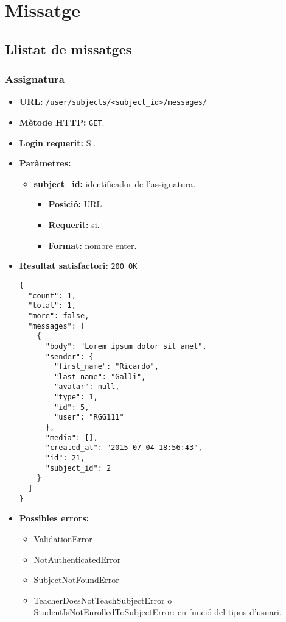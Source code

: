 \section{Missatge}

\subsection{Llistat de missatges}

	\subsubsection{Assignatura}
	\begin{itemize}
\item \textbf{\ac{URL}:} \texttt{/user/subjects/<subject\_id>/messages/}
\item \textbf{Mètode \ac{HTTP}: } \texttt{GET}.
\item \textbf{Login requerit:} Si.
\item \textbf{Paràmetres:}
	\begin{itemize}
		\item \textbf{subject\_id:} identificador de l'assignatura.
		\begin{itemize}
			\item \textbf{Posició:} \ac{URL}
			\item \textbf{Requerit:} si.
			\item \textbf{Format:} nombre enter.
		\end{itemize}
	\end{itemize}
\item \textbf{Resultat satisfactori:} \texttt{200 OK}
	\begin{verbatim}
{
  "count": 1,
  "total": 1,
  "more": false,
  "messages": [
    {
      "body": "Lorem ipsum dolor sit amet",
      "sender": {
        "first_name": "Ricardo",
        "last_name": "Galli",
        "avatar": null,
        "type": 1,
        "id": 5,
        "user": "RGG111"
      },
      "media": [],
      "created_at": "2015-07-04 18:56:43",
      "id": 21,
      "subject_id": 2
    }
  ]
}
	\end{verbatim}
\item \textbf{Possibles errors:}
	\begin{itemize}
		\item ValidationError
		\item NotAuthenticatedError
		\item SubjectNotFoundError
		\item TeacherDoesNotTeachSubjectError o StudentIsNotEnrolledToSubjectError: en funció del tipus d'usuari.
	
	\end{itemize}
	\end{itemize}
	
